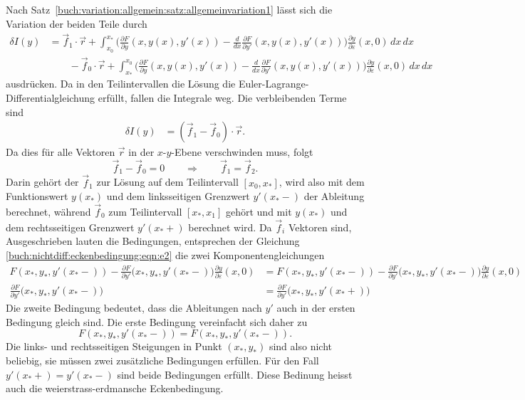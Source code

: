 Nach Satz~\ref{buch:variation:allgemein:satz:allgemeinvariation1} 
lässt sich die Variation der beiden Teile durch 
\begin{align*}
\delta I(y)
&=
\vec{f}_1\cdot \vec{r}
+
\int_{x_0}^{x_*}
\biggl(
\frac{\partial F}{\partial y}(x,y(x),y'(x))
-
\frac{d}{dx}
\frac{\partial F}{\partial y'}(x,y(x),y'(x))
\biggr)
\frac{\partial y}{\partial\varepsilon}(x,0)\,dx
\,dx
\\
&\qquad
-
\vec{f}_0\cdot \vec{r}
+
\int_{x_*}^{x_0}
\biggl(
\frac{\partial F}{\partial y}(x,y(x),y'(x))
-
\frac{d}{dx}
\frac{\partial F}{\partial y'}(x,y(x),y'(x))
\biggr)
\frac{\partial y}{\partial\varepsilon}(x,0)\,dx
\,dx
\end{align*}
ausdrücken.
Da in den Teilintervallen die Lösung die Euler-Lagrange-Differentialgleichung
erfüllt, fallen die Integrale weg.
Die verbleibenden Terme sind
\begin{align*}
\delta I(y)
&=
(\vec{f}_1-\vec{f}_0)\cdot \vec{r}.
\end{align*}
Da dies für alle Vektoren $\vec{r}$ in der $x$-$y$-Ebene verschwinden muss,
folgt
\begin{equation}
\vec{f}_1-\vec{f}_0
=
0
\qquad\Rightarrow\qquad
\vec{f}_1=\vec{f}_2.
\label{buch:nichtdiff:eckenbedingung:eqn:e2}
\end{equation}
Darin gehört der $\vec{f}_1$ zur Lösung auf dem Teilintervall $[x_0,x_*]$,
wird also mit dem Funktionswert $y(x_*)$ und dem linksseitigen Grenzwert
$y'(x_*-)$ der Ableitung berechnet, während $\vec{f}_0$ zum Teilintervall
$[x_*,x_1]$ gehört und mit $y(x_*)$ und dem rechtsseitigen Grenzwert
$y'(x_*+)$ berechnet wird.
Da $\vec{f}_i$ Vektoren sind, 
Ausgeschrieben lauten die Bedingungen, entsprechen der Gleichung
\eqref{buch:nichtdiff:eckenbedingung:eqn:e2}
die zwei Komponentengleichungen
\begin{align*}
F(x_*,y_*,y'(x_*-))
- 
\frac{\partial F}{\partial y'}\bigl(x_*,y_*, y'(x_*-)\bigr)
\frac{\partial y}{\partial\varepsilon}(x,0)
&=
F(x_*,y_*,y'(x_*-))
- 
\frac{\partial F}{\partial y'}\bigl(x_*,y_*, y'(x_*-)\bigr)
\frac{\partial y}{\partial\varepsilon}(x,0)
\\
\frac{\partial F}{\partial y'}\bigl(x_*,y_*, y'(x_*-)\bigr)
&=
\frac{\partial F}{\partial y'}\bigl(x_*,y_*, y'(x_*+)\bigr)
\end{align*}
Die zweite Bedingung bedeutet, dass die Ableitungen nach $y'$ auch
in der ersten Bedingung gleich sind.
Die erste Bedingung vereinfacht sich daher zu
\[
F(x_*,y_*,y'(x_*-))
=
F(x_*,y_*,y'(x_*-)).
\]
Die links- und rechtsseitigen Steigungen in Punkt $(x_*,y_*)$ sind
also nicht beliebig, sie müssen zwei zusätzliche Bedingungen erfüllen.
Für den Fall $y'(x_*+)=y'(x_*-)$ sind beide Bedingungen erfüllt.
Diese Bedinung heisst auch die weierstrass-erdmansche Eckenbedingung.

